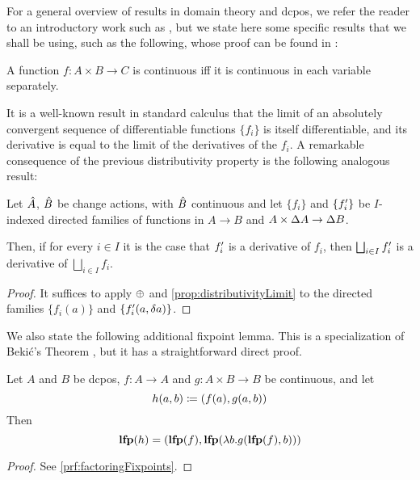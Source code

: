 For a general overview of results in domain theory and dcpos, we refer the reader to an
introductory work such as \cite{abramsky1994domain}, but we state here some specific results that
we shall be using, such as the following, whose proof can be found in 
\cite[Lemma~3.2.6]{abramsky1994domain}:

\begin{prop}
  \label{prop:distributivityLimit}
  A function $f : A \times B \rightarrow C$ is continuous iff it is continuous in each variable
  separately.
\end{prop}

It is a well-known result in standard calculus that the limit of an absolutely convergent sequence of
differentiable functions $\{f_i\}$ is itself differentiable, and its derivative is equal to the limit
of the derivatives of the $f_i$. A remarkable consequence of the previous distributivity property
is the following analogous result:

\begin{corollary}
  \label{cor:diffContinuous}
  Let $\hat{A}$, $\hat{B}$ be change actions, with $\hat{B}$ continuous and let $\{f_i\}$ and $\{f_i'\}$ be
  $I$-indexed directed families of functions in $A \rightarrow B$ and $A \times \Delta A \rightarrow \Delta B$.

  Then, if for every $i \in I$ it is the case that $f_i'$ is a derivative of $f_i$, then $\bigsqcup_{i \in I} f_i'$ is
  a derivative of $\bigsqcup_{i \in I} f_i $.
\end{corollary}
\ifproofs
\begin{proof}
  It suffices to apply $\oplus$ and \cref{prop:distributivityLimit} to the directed families $\{ f_i(a) \}$ and
  $\{ f_i'(a, \delta a) \}$.
\end{proof}
\fi

We also state the following additional fixpoint lemma. This is a specialization of
Beki\'c's Theorem \autocite[][section 10.1]{winskel1993formal}, but it has a straightforward direct proof.

\begin{prop}[name=Factoring of fixpoints, restate=factoringFixpoints]
  \label{prop:factoringFixpoints}
  Let $A$ and $B$ be dcpos, $f : A \rightarrow A$ and $g: A \times B \rightarrow B$ be continuous, and let
  \begin{displaymath}
    h(a, b) \coloneqq (f(a), g(a, b))
  \end{displaymath}
  Then
  \begin{displaymath}
    \mathbf{lfp}(h) = (\mathbf{lfp}(f), \mathbf{lfp}(\lambda b . g(\mathbf{lfp}(f), b)))
  \end{displaymath}
\end{prop}
\ifproofs
\begin{proof}
  See \cref{prf:factoringFixpoints}.
\end{proof}
\fi

